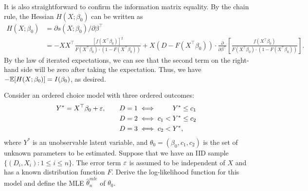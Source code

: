 \documentclass[11pt, A4paper, openany, uplatex]{book}
\begin{document}
It is also straightforward to confirm the information matrix equality.
By the chain rule, the Hessian $H(X; \beta_0)$ can be written as
\begin{align*}
	H(X; \beta_0) 
	& = \partial s(X; \beta_0)/ \partial \beta^\top \\
	& = - XX^\top \frac{[f(X^\top \beta_0)]^2}{F(X^\top \beta_0) \cdot (1 -  F(X^\top\beta_0)) } + X (D - F(X^\top \beta_0)) \cdot \frac{\partial}{\partial \beta^\top} \left[ \frac{f(X^\top \beta_0)}{F(X^\top \beta_0) \cdot (1 -  F(X^\top\beta_0)) }\right].
\end{align*}
By the law of iterated expectations, we can see that the second term on the right-hand side will be zero after taking the expectation.
Thus, we have $-\mathbb{E}[H(X; \beta_0) ] = I(\beta_0)$, as desired.

\hrulefill
\begin{exercise}\upshape
	Consider an ordered choice model with three ordered outcomes:
	\begin{align*}
	Y^* 
	= X^\top\beta_0 + \varepsilon, \qquad D = 1 \iff  \qquad\:  Y^* & \le c_1 \\
	D = 2  \iff c_1 < Y^* & \le c_2 \\
	D = 3  \iff c_2 < Y^* &,
	\end{align*}
	where $Y^*$ is an unobservable latent variable, and $\theta_0 = (\beta_0, c_1, c_2)$ is the set of unknown parameters to be estimated.
	Suppose that we have an IID sample $\{(D_i, X_i): 1 \le i \le n\}$.
	The error term $\varepsilon$ is assumed to be independent of $X$ and has a known distribution function $F$.
	Derive the log-likelihood function for this model and define the MLE $\hat \theta_n^{mle}$ of $\theta_0$.
\end{exercise}
\end{document}
